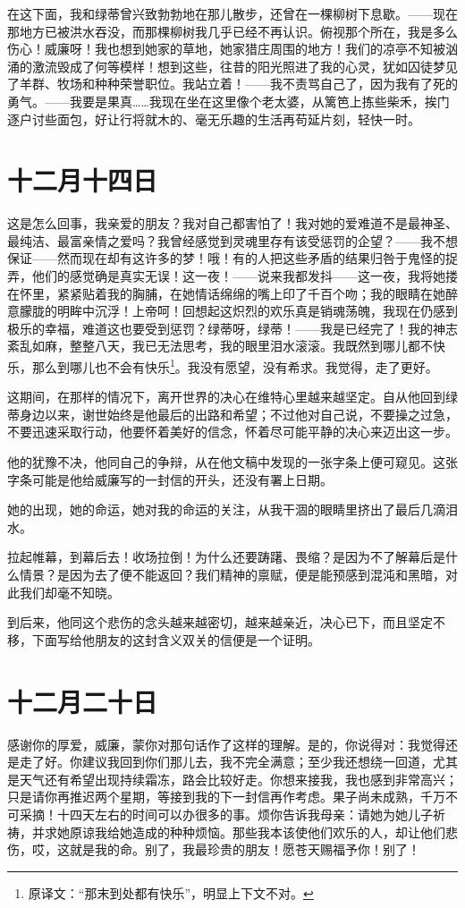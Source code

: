 \documentclass[12pt,oneside]{book}
\begin{document}
在这下面，我和绿蒂曾兴致勃勃地在那儿散步，还曾在一棵柳树下息歇。——现在那地方已被洪水吞没，而那棵柳树我几乎已经不再认识。俯视那个所在，我是多么伤心！威廉呀！我也想到她家的草地，她家猎庄周围的地方！我们的凉亭不知被汹涌的激流毁成了何等模样！想到这些，往昔的阳光照进了我的心灵，犹如囚徒梦见了羊群、牧场和种种荣誉职位。我站立着！——我不责骂自己了，因为我有了死的勇气。——我要是果真……我现在坐在这里像个老太婆，从篱笆上拣些柴禾，挨门逐户讨些面包，好让行将就木的、毫无乐趣的生活再苟延片刻，轻快一时。
　　

\chapter{十二月十四日}
这是怎么回事，我亲爱的朋友？我对自己都害怕了！我对她的爱难道不是最神圣、最纯洁、最富亲情之爱吗？我曾经感觉到灵魂里存有该受惩罚的企望？——我不想保证——然而现在却有这许多的梦！哦！有的人把这些矛盾的结果归咎于鬼怪的捉弄，他们的感觉确是真实无误！这一夜！——说来我都发抖——这一夜，我将她搂在怀里，紧紧贴着我的胸脯，在她情话绵绵的嘴上印了千百个吻；我的眼睛在她醉意朦胧的明眸中沉浮！上帝呵！回想起这炽烈的欢乐真是销魂荡魄，我现在仍感到极乐的幸福，难道这也要受到惩罚？绿蒂呀，绿蒂！——我是已经完了！我的神志紊乱如麻，整整八天，我已无法思考，我的眼里泪水滚滚。我既然到哪儿都不快乐，那么到哪儿也不会有快乐\footnote{原译文：“那末到处都有快乐”，明显上下文不对。}。我没有愿望，没有希求。我觉得，走了更好。

\begin{framed}
这期间，在那样的情况下，离开世界的决心在维特心里越来越坚定。自从他回到绿蒂身边以来，谢世始终是他最后的出路和希望；不过他对自己说，不要操之过急，不要迅速采取行动，他要怀着美好的信念，怀着尽可能平静的决心来迈出这一步。

他的犹豫不决，他同自己的争辩，从在他文稿中发现的一张字条上便可窥见。这张字条可能是他给威廉写的一封信的开头，还没有署上日期。
\end{framed}

她的出现，她的命运，她对我的命运的关注，从我干涸的眼睛里挤出了最后几滴泪水。

拉起帷幕，到幕后去！收场拉倒！为什么还要踌躇、畏缩？是因为不了解幕后是什么情景？是因为去了便不能返回？我们精神的禀赋，便是能预感到混沌和黑暗，对此我们却毫不知晓。

\begin{framed}
到后来，他同这个悲伤的念头越来越密切，越来越亲近，决心已下，而且坚定不移，下面写给他朋友的这封含义双关的信便是一个证明。
\end{framed}

\chapter{十二月二十日}
感谢你的厚爱，威廉，蒙你对那句话作了这样的理解。是的，你说得对：我觉得还是走了好。你建议我回到你们那儿去，我不完全满意；至少我还想绕一回道，尤其是天气还有希望出现持续霜冻，路会比较好走。你想来接我，我也感到非常高兴；只是请你再推迟两个星期，等接到我的下一封信再作考虑。果子尚未成熟，千万不可采摘！十四天左右的时间可以办很多的事。烦你告诉我母亲：请她为她儿子祈祷，并求她原谅我给她造成的种种烦恼。那些我本该使他们欢乐的人，却让他们悲伤，哎，这就是我的命。别了，我最珍贵的朋友！愿苍天赐福予你！别了！
\end{document}

